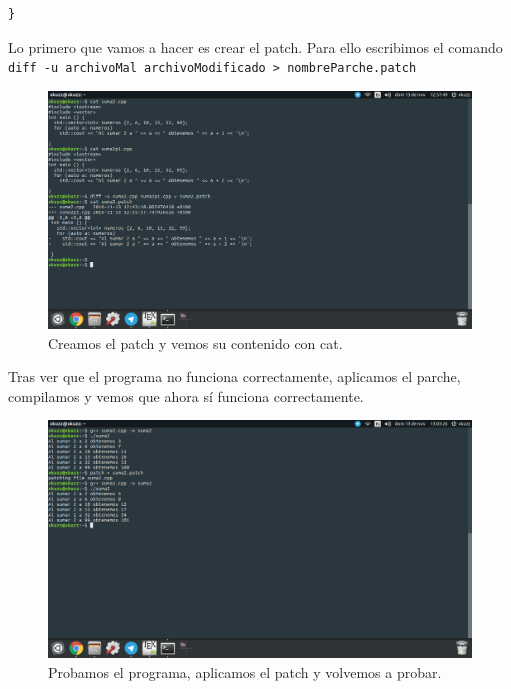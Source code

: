 \begin{flushleft}
\begin{verbatim}
}
\end{verbatim}

Lo primero que vamos a hacer es crear el patch. Para ello escribimos el comando \verb|diff -u archivoMal archivoModificado > nombreParche.patch|

\begin{figure}[H]
	\centering
	\includegraphics[scale=0.3]{patch1.png}
	\caption{Creamos el patch y vemos su contenido con cat.}
\end{figure}

Tras ver que el programa no funciona correctamente, aplicamos el parche, compilamos y vemos que ahora sí funciona correctamente.

\begin{figure}[H]
	\centering
	\includegraphics[scale=0.3]{patch2.png}
	\caption{Probamos el programa, aplicamos el patch y volvemos a probar.}
\end{figure}





\end{flushleft}
